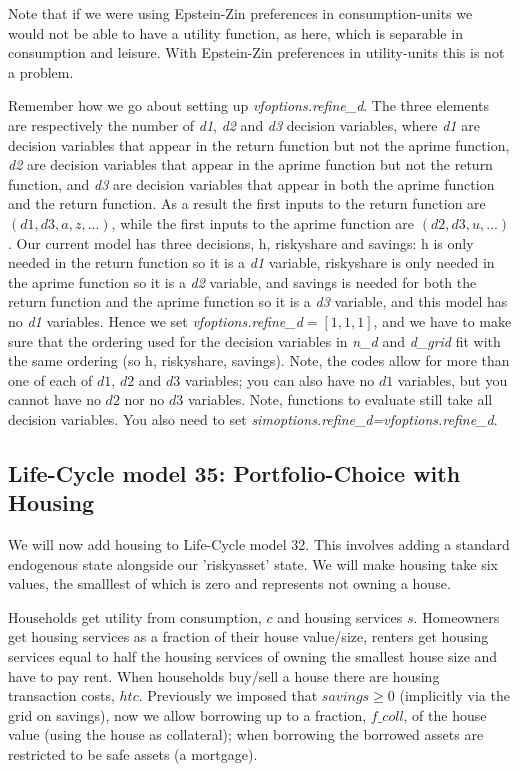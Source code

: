 Note that if we were using Epstein-Zin preferences in consumption-units we would not be able to have a utility function, as here, which is separable in consumption and leisure. With Epstein-Zin preferences in utility-units this is not a problem.

Remember how we go about setting up \textit{vfoptions.refine\_{}d}. The three elements are respectively the number of \textit{d1}, \textit{d2} and \textit{d3} decision variables, where \textit{d1} are decision variables that appear in the return function but not the aprime function, \textit{d2} are decision variables that appear in the aprime function but not the return function, and \textit{d3} are decision variables that appear in both the aprime function and the return function. As a result the first inputs to the return function are $(d1,d3,a,z,...)$, while the first inputs to the aprime function are $(d2,d3,u,...)$. Our current model has three decisions, h, riskyshare and savings: h is only needed in the return function so it is a \textit{d1} variable, riskyshare is only needed in the aprime function so it is a \textit{d2} variable, and savings is needed for both the return function and the aprime function so it is a \textit{d3} variable, and this model has no \textit{d1} variables. Hence we set \textit{vfoptions.refine\_{}d}$=[1,1,1]$, and we have to make sure that the ordering used for the decision variables in \textit{n\_{}d} and \textit{d\_{}grid} fit with the same ordering (so h, riskyshare, savings). Note, the codes allow for more than one of each of $d1$, $d2$ and $d3$ variables; you can also have no $d1$ variables, but you cannot have no $d2$ nor no $d3$ variables. Note, functions to evaluate still take all decision variables. You also need to set \textit{simoptions.refine\_{}d=vfoptions.refine\_{}d}.



\subsection{Life-Cycle model 35: Portfolio-Choice with Housing}
We will now add housing to Life-Cycle model 32. This involves adding a standard endogenous state alongside our 'riskyasset' state. We will make housing take six values, the smalllest of which is zero and represents not owning a house.

Households get utility from consumption, $c$ and housing services $s$. Homeowners get housing services as a fraction of their house value/size, renters get housing services equal to half the housing services of owning the smallest house size and have to pay rent. When households buy/sell a house there are housing transaction costs, $htc$. Previously we imposed that $savings\geq 0$ (implicitly via the grid on savings), now we allow borrowing up to a fraction, $f\_{}coll$, of the house value (using the house as collateral); when borrowing the borrowed assets are restricted to be safe assets (a mortgage).

